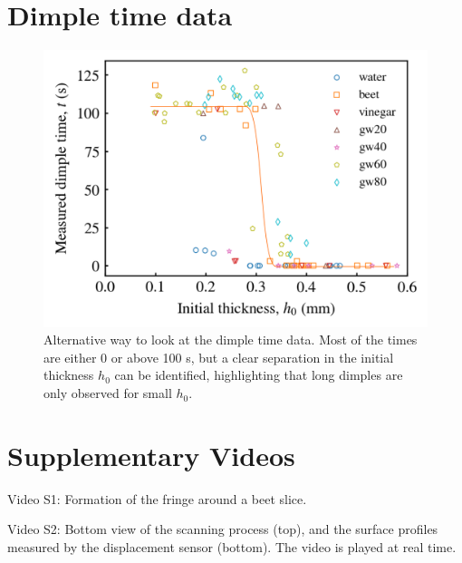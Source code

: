 \documentclass[aps,preprint]{revtex4-2}
\begin{document}
\newpage

\section{Dimple time data}

\begin{figure}[ht]
    \centering
    \includegraphics[width=\linewidth]{Figures/all_dimple_time_data.png}
    \caption{
    Alternative way to look at the dimple time data. Most of the times are either 0 or above 100 s, but a clear separation in the initial thickness $h_0$ can be identified, highlighting that long dimples are only observed for small $h_0$.
    }
    \label{fig:all-dimple-time-data}
\end{figure}


\newpage
\section{Supplementary Videos}

Video S1: Formation of the fringe around a beet slice.

Video S2: Bottom view of the scanning process (top), and the surface profiles measured by the displacement sensor (bottom). The video is played at real time. 
\end{document}
